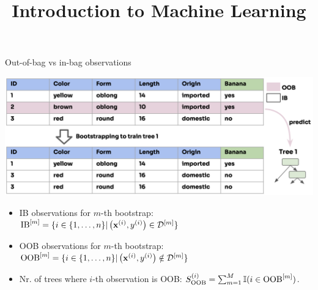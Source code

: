 \documentclass[11pt,compress,t,notes=noshow,xcolor=table]{beamer}
\title{Introduction to Machine Learning}
\begin{document}

\begin{vbframe}{Out-of-bag vs in-bag observations}

\begin{center}
\includegraphics[width=\textwidth]{figure_man/forest-oob.png}
\end{center}

\begin{itemize}
\item IB observations for $m$-th bootstrap: $\mathrm{IB}^{[m]} = \{i \in \{1, \ldots, n\} | \left(\mathbf{x}^{(i)}, y^{(i)}\right) \in \mathcal{D}^{[m]}  \} $
\item OOB observations for $m$-th bootstrap: $\mathrm{OOB}^{[m]} = \{i \in \{1, \ldots, n\} | \left(\mathbf{x}^{(i)}, y^{(i)}\right) \notin \mathcal{D}^{[m]}  \} $
  \item Nr. of trees where $i$-th observation is OOB: $S_{\mathrm{OOB}}^{(i)} = \sum_{m=1}^M \mathbb{I}(i \in \mathrm{OOB}^{[m]})$.
\end{itemize}

\end{vbframe}
\end{document}
